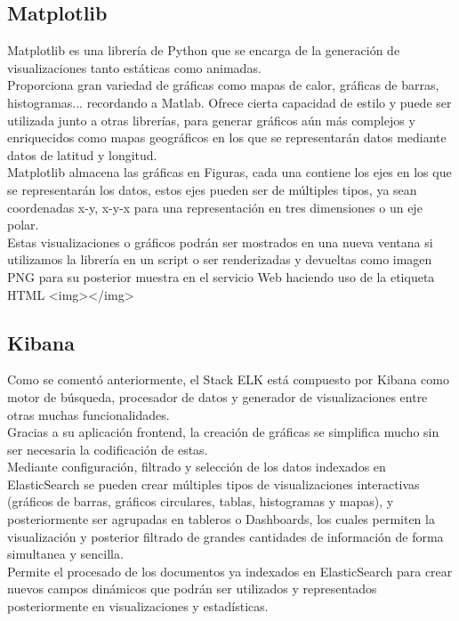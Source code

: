 \documentclass[11pt,a4paper]{book}
\begin{document}
			\subsection{Matplotlib}
				Matplotlib es una librería de Python que se encarga de la generación de visualizaciones tanto estáticas como animadas. \\
				
				Proporciona gran variedad de gráficas como mapas de calor, gráficas de barras, histogramas... recordando a Matlab. Ofrece cierta capacidad de estilo y puede ser utilizada junto a otras librerías, para generar gráficos aún más complejos y enriquecidos como mapas geográficos en los que se representarán datos mediante datos de latitud y longitud. \\
				
				Matplotlib almacena las gráficas en Figuras, cada una contiene los ejes en los que se representarán los datos, estos ejes pueden ser de múltiples tipos, ya sean coordenadas x-y, x-y-x para una representación en tres dimensiones o un eje polar.\\
							
				Estas visualizaciones o gráficos podrán ser mostrados en una nueva ventana si utilizamos la librería en un script o ser renderizadas y devueltas como imagen PNG para su posterior muestra en el servicio Web haciendo uso de la etiqueta HTML <img></img>
			\subsection{Kibana}
				Como se comentó anteriormente, el Stack ELK está compuesto por Kibana como motor de búsqueda, procesador de datos y generador de visualizaciones entre otras muchas funcionalidades.\\
				Gracias a su aplicación frontend, la creación de gráficas se simplifica mucho sin ser necesaria la codificación de estas. \\
				Mediante configuración, filtrado y selección de los datos indexados en ElasticSearch se pueden crear múltiples tipos de visualizaciones interactivas (gráficos de barras, gráficos circulares, tablas, histogramas y mapas), y posteriormente ser agrupadas en tableros o Dashboards, los cuales permiten la visualización y posterior filtrado de grandes cantidades de información de forma simultanea y sencilla.\\
				Permite el procesado de los documentos ya indexados en ElasticSearch para crear nuevos campos dinámicos que podrán ser utilizados y representados posteriormente en visualizaciones y estadísticas.
				
\end{document}
